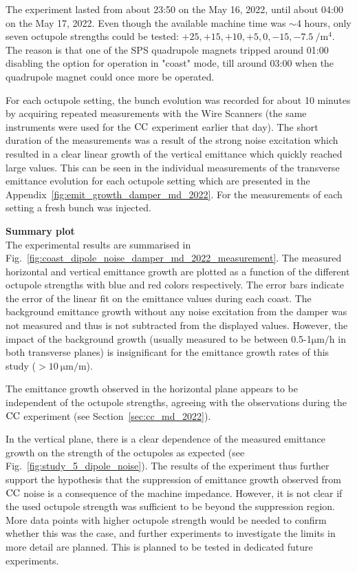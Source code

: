 The experiment lasted from about 23:50 on the May 16, 2022, until about 04:00 on the May 17, 2022. Even though the available machine time was $\sim$4 hours, only seven octupole strengths could be tested: $+25, +15, +10, +5, 0, -15, -7.5 \ \mathrm{/m^4}$. The reason is that one of the SPS quadrupole magnets tripped around 01:00 disabling the option for operation in "coast" mode, till around 03:00 when the quadrupole magnet could once more be operated.

For each octupole setting, the bunch evolution was recorded for about 10 minutes by acquiring repeated measurements with the Wire Scanners (the same instruments were used for the ${\mathrm{CC}}$ experiment earlier that day). The short duration of the measurements was a result of the strong noise excitation which resulted in a clear linear growth of the vertical emittance which quickly reached large values. This can be seen in the individual measurements of the transverse emittance evolution for each octupole setting which are presented in the Appendix~\ref{fig:emit_growth_damper_md_2022}. For the measurements of each setting a fresh bunch was injected. 

\textbf{Summary plot}\\
The experimental results are summarised in Fig.~\ref{fig:coast_dipole_noise_damper_md_2022_measurement}. The measured horizontal and vertical emittance growth are plotted as a function of the different octupole strengths with blue and red colors respectively. The error bars indicate the error of the linear fit on the emittance values during each coast. The background emittance growth without any noise excitation from the damper was not measured and thus is not subtracted from the displayed values. However, the impact of the background growth (usually measured to be between 0.5-1$\mathrm{\mu m/h}$ in both transverse planes) is insignificant for the emittance growth rates of this study ($ > 10 \ \mathrm{\mu m/m}$).
 

The emittance growth observed in the horizontal plane appears to be independent of the octupole strengths, agreeing with the observations during the ${\mathrm{CC}}$ experiment (see Section~\ref{sec:cc_md_2022}). 

In the vertical plane, there is a clear dependence of the measured emittance growth on the strength of the octupoles as expected (see Fig.~\ref{fig:study_5_dipole_noise}). The results of the experiment thus further support the hypothesis that the suppression of emittance growth observed from ${\mathrm{CC}}$ noise is a consequence of the machine impedance. However, it is not clear if the used octupole strength was sufficient to be beyond the suppression region. More data points with higher octupole strength would be needed to confirm whether this was the case, and further experiments to investigate the limits in more detail are planned. This is planned to be tested in dedicated future experiments.

